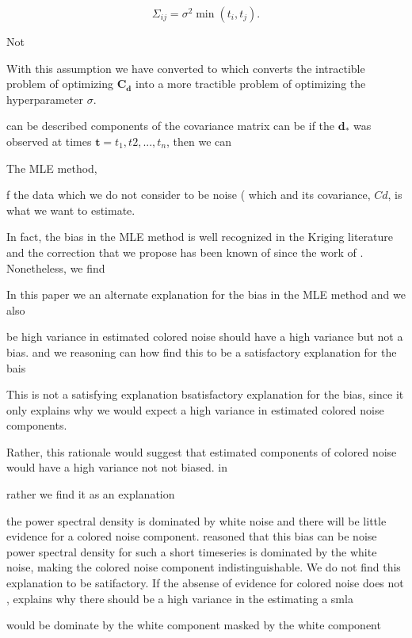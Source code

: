 \documentclass[10pt,a4paper]{article}
\begin{document}
\begin{equation}\label{RandomWalk}
  \Sigma_{ij} = \sigma^2\min(t_i,t_j).
\end{equation}

Not

With this assumption we have converted to 
which converts the intractible problem of optimizing $\mathbf{C_d}$ into a more tractible problem of optimizing the hyperparameter $\sigma$. 

can be described  components of the covariance matrix can be   if the $\mathbf{d_*}$ was observed at times $\mathbf{t} = {t_1,t2,...,t_n}$, then we can      

The MLE method, 

  f the data which we do not consider to be noise ( which     and its covariance, $Cd$, is what we want to estimate.  

In fact, the bias in the MLE method is well recognized in the Kriging literature \citep[e.g][]{Cressie1992} and the correction that we propose has been known of since the work of \citet{Patterson1971}. Nonetheless, we find         

In this paper we an alternate explanation for the bias in the MLE method and we also     

be high variance in estimated colored noise should have a high variance but not a bias.   and we reasoning can how find this to be a satisfactory explanation for the bais

This is not a satisfying explanation bsatisfactory explanation for the bias, since it only explains why we would expect a high variance in estimated colored noise components.

Rather, this rationale would suggest that estimated components of colored noise would have a high variance not not biased. in 

rather we find it as an explanation    

the power spectral density is dominated by white noise and there will be little evidence for a colored noise component.   \citet{Langbein2012} reasoned that this bias can be noise power spectral density for such a short timeseries is dominated by the white noise, making the colored noise component indistinguishable.  We do not find this explanation to be satifactory. If the absense of evidence for colored noise does not ,  explains why there should be a high variance in the  estimating a smla   

   

would be dominate by the white component  masked by the white component   
\end{document}
